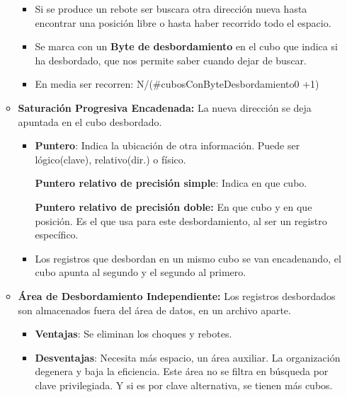 \documentclass[12pt, twoside, openright]{report} %
\begin{document}
\begin{itemize}
\begin{itemize}
\begin{itemize}
        \item Si se produce un rebote ser buscara otra dirección nueva hasta
          encontrar una posición libre o hasta haber recorrido todo el
          espacio.
          
        \item Se marca con un \textbf{Byte de desbordamiento} en el cubo que
          indica si ha desbordado, que nos permite saber cuando dejar de
          buscar.
          
        \item En media ser recorren: N/(\#cubosConByteDesbordamiento0 +1)
          
        \end{itemize}
      \item \textbf{Saturación Progresiva Encadenada:} La nueva dirección se
        deja apuntada en el cubo desbordado.
        

        \begin{itemize}
        \item \textbf{Puntero}: Indica la ubicación de otra información.
          Puede ser lógico(clave), relativo(dir.) o físico.
          

          
		  
            \textbf{Puntero relativo de precisión simple}: Indica en que
            cubo.
          
			
            \textbf{Puntero relativo de precisión doble:} En que cubo y
            en que posición. Es el que usa para este desbordamiento, al
            ser un registro específico.
           
			
        \item Los registros que desbordan en un mismo cubo se van
          encadenando, el cubo apunta al segundo y el segundo al
          primero.
          
        \end{itemize}
      \item \textbf{Área de Desbordamiento Independiente:} Los registros
        desbordados son almacenados fuera del área de datos, en un
        archivo aparte.
        

        \begin{itemize}
        \item \textbf{Ventajas}: Se eliminan los choques y rebotes.
          
        \item \textbf{Desventajas}: Necesita más espacio, un área auxiliar.
          La organización degenera y baja la eficiencia. Este área no se
          filtra en búsqueda por clave privilegiada. Y si es por clave
          alternativa, se tienen más cubos.
          

\end{itemize}
\end{itemize}
\end{itemize}
\end{document}
